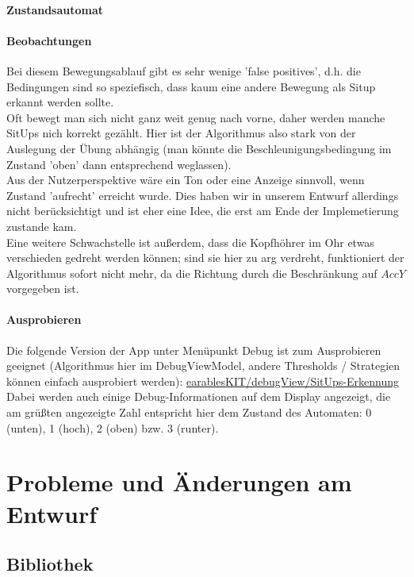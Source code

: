 \documentclass[a4paper,12pt]{article}
\begin{document}
\paragraph{Zustandsautomat}

\paragraph{Beobachtungen}
Bei diesem Bewegungsablauf gibt es sehr wenige 'false positives', d.h. die Bedingungen sind so speziefisch, dass kaum eine andere Bewegung als Situp erkannt werden sollte.\\
Oft bewegt man sich nicht ganz weit genug nach vorne, daher werden manche SitUps nich korrekt gezählt. Hier ist der Algorithmus also stark von der Auslegung der Übung abhängig (man könnte die Beschleunigungsbedingung im Zustand 'oben' dann entsprechend weglassen).\\
Aus der Nutzerperspektive wäre ein Ton oder eine Anzeige sinnvoll, wenn Zustand 'aufrecht' erreicht wurde. Dies haben wir in unserem Entwurf allerdings nicht berücksichtigt und ist eher eine Idee, die erst am Ende der Implemetierung zustande kam.\\
Eine weitere Schwachstelle ist außerdem, dass die Kopfhöhrer im Ohr etwas verschieden gedreht werden können; sind sie hier zu arg verdreht, funktioniert der Algorithmus sofort nicht mehr, da die Richtung durch die Beschränkung auf $AccY$ vorgegeben ist.
\paragraph{Ausprobieren}
Die folgende Version der App unter Menüpunkt Debug ist zum Ausprobieren geeignet (Algorithmus hier im DebugViewModel, andere Thresholds / Strategien können einfach ausprobiert werden): 
\href{https://github.com/vlle1/earablesKIT/tree/cd774e370156ea3d13eff2879a2d7f0f7d541260}{earablesKIT/debugView/SitUps-Erkennung}\\
Dabei werden auch einige Debug-Informationen auf dem Display angezeigt, die am grüßten angezeigte Zahl entspricht hier dem Zustand des Automaten: 0 (unten), 1 (hoch), 2 (oben) bzw. 3 (runter).
\section{Probleme und Änderungen am Entwurf}
\label{aenderungen}
\subsection{Bibliothek}
\end{document}
